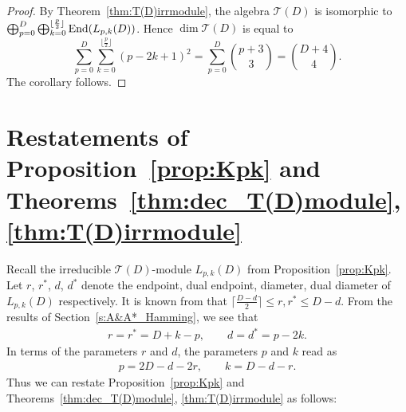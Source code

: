 \documentclass[10pt,a4paper]{amsart}
\def\End{{\rm End}}
\def\T{\mathcal T}
\numberwithin{equation}{section}
\begin{document}
\begin{proof}
By Theorem~\ref{thm:T(D)irrmodule}, the algebra $\T(D)$ is isomorphic to
$\bigoplus_{p=0}^D
\bigoplus_{k=0}^{\lfloor \frac{p}{2}\rfloor}
\End(L_{p,k}(D))$.
Hence $\dim \T(D)$ is equal to
\[
\sum_{p=0}^D
\sum_{k=0}^{\lfloor \frac{p}{2}\rfloor}
(p-2k+1)^2
=\sum_{p=0}^D {p+3\choose 3}
={D+4\choose 4}.
\]
The corollary follows.
\end{proof}

\appendix
\section{Restatements of Proposition~\ref{prop:Kpk} and Theorems~\ref{thm:dec_T(D)module}, \ref{thm:T(D)irrmodule}}\label{s:restate}

Recall the irreducible $\T(D)$-module $L_{p,k}(D)$ from Proposition~\ref{prop:Kpk}. Let $r$, $r^*$, $d$, $d^*$ denote the endpoint, dual endpoint, diameter, dual diameter of $L_{p,k}(D)$ respectively. It is known from \cite[p.~197]{TerAlgebraIII} that $\big\lceil \frac{D-d}{2}\big\rceil\leq r, r^* \leq D-d$.
From the results of Section~\ref{s:A&A*_Hamming}, we see that
\begin{align*}
r=r^*=D+k-p,\qquad
d=d^*=p-2k.
\end{align*}
In terms of the parameters $r$ and $d$, the parameters $p$ and $k$ read as
\begin{align*}
p=2D-d-2r,\qquad
k=D-d-r.
\end{align*}
Thus we can restate Proposition~\ref{prop:Kpk} and Theorems~\ref{thm:dec_T(D)module}, \ref{thm:T(D)irrmodule} as follows:
\end{document}
